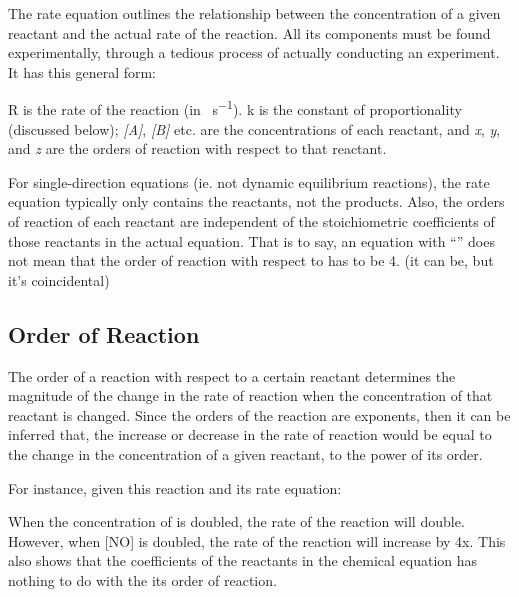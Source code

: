 		\pagebreak

		The rate equation outlines the relationship between the concentration of a given reactant and the actual rate of the reaction.
		All its components must be found experimentally, through a tedious process of actually conducting an experiment. It has this
		general form:


		R is the rate of the reaction (in \si{\molarConc\per\second}). k is the constant of proportionality
		(discussed below); \textit{[A]}, \textit{[B]} etc. are the concentrations of each reactant, and \textit{x}, \textit{y}, and
		\textit{z} are the orders of reaction with respect to that reactant.

		For single-direction equations (ie. not dynamic equilibrium reactions), the rate equation typically only contains the reactants, not
		the products. Also, the orders of reaction of each reactant are independent of the stoichiometric coefficients of those reactants in
		the actual equation. That is to say, an equation with ``'' does not mean that the order of reaction with respect to
		 has to be 4. (it can be, but it's coincidental)



		\subsection{Order of Reaction}

			The order of a reaction with respect to a certain reactant determines the magnitude of the change in the rate of reaction when the
			concentration of that reactant is changed. Since the orders of the reaction are exponents, then it can be inferred that, the
			increase or decrease in the rate of reaction would be equal to the change in the concentration of a given reactant, to the power
			of its order.

			For instance, given this reaction and its rate equation:


			When the concentration of  is doubled, the rate of the reaction will double. However, when [NO] is doubled, the rate of the
			reaction will increase by 4x. This also shows that the coefficients of the reactants in the chemical equation has nothing to do
			with the its order of reaction.

